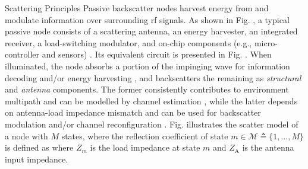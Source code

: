 \documentclass[journal]{IEEEtran}
\begin{document}
\begin{section}{Scattering Principles}
	Passive backscatter nodes harvest energy from and modulate information over surrounding \gls{rf} signals.
	As shown in Fig. , a typical passive node consists of a scattering antenna, an energy harvester, an integrated receiver, a load-switching modulator, and on-chip components (e.g., micro-controller and sensors) \cite{Dobkin2012}.
	Its equivalent circuit is presented in Fig. .
	When illuminated, the node absorbs a portion of the impinging wave for information decoding and/or energy harvesting \cite{Kim2021a}, and backscatters the remaining as \emph{structural} and \emph{antenna} components.
	The former consistently contributes to environment multipath and can be modelled by channel estimation \cite{Boyer2014}, while the latter depends on antenna-load impedance mismatch and can be used for backscatter modulation \cite{Boyer2012} and/or channel reconfiguration \cite{Wu2021b}.
	Fig.  illustrates the scatter model of a node with $M$ states, where the reflection coefficient of state $m \in \mathcal{M} \triangleq \{1,\ldots,M\}$ is defined as%
	where $Z_m$ is the load impedance at state $m$ and $Z_{\mathrm{A}}$ is the antenna input impedance.


\end{section}
\end{document}
